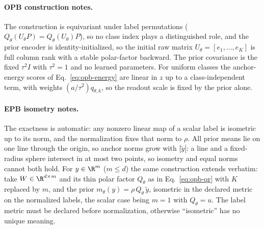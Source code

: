 \paragraph{OPB construction notes.} The construction is equivariant under label
permutations ($Q_\theta(U_\theta P)=Q_\theta(U_\theta)P$), so no class index plays a
distinguished role, and the prior encoder is identity-initialized, so the initial
raw matrix $U_\theta=[e_1,\dots,e_K]$ is full column rank with a stable
polar-factor backward. The prior covariance is the fixed $\tau^2I$ with
$\tau^2=1$ and no learned parameters. For uniform classes the anchor-energy
scores of Eq.~\eqref{eq:opb-energy} are linear in $z$ up to a class-independent
term, with weights $(a/\tau^2)q_{\theta,k}$, so the readout scale is fixed by
the prior alone.

\paragraph{EPB isometry notes.} The exactness is automatic: any
nonzero linear map of a scalar label is isometric up to its norm, and the
normalization fixes that norm to $\rho$. All prior means lie on one line through
the origin, so anchor norms grow with $|\tilde y|$: a line and a fixed-radius
sphere intersect in at most two points, so isometry and equal norms cannot both
hold. For $y\in\R^m$ ($m\le d$) the same construction extends verbatim: take
$W\in\R^{d\times m}$ and its thin polar factor $Q_\theta$ as in
Eq.~\eqref{eq:opb-qr} with $K$ replaced by $m$, and the prior
$m_\theta(y)=\rho\, Q_\theta\, \tilde y$, isometric in the declared metric on
the normalized labels, the scalar case being $m=1$ with $Q_\theta=u$. The label
metric must be declared before normalization, otherwise ``isometric'' has no
unique meaning.
